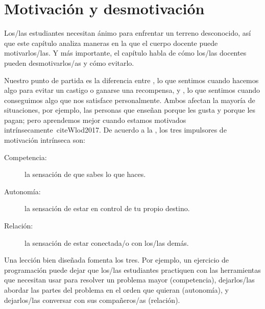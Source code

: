 \chapter{Motivación y desmotivación}\label{s:motivation}

Los/las estudiantes necesitan ánimo para enfrentar un terreno desconocido,
así que este capítulo analiza maneras en la que el cuerpo docente puede motivarlos/las.
Y más importante,
el capítulo habla de cómo los/las docentes pueden desmotivarlos/as
y cómo evitarlo.

Nuestro punto de partida es la diferencia entre
,
lo que sentimos cuando hacemos algo para evitar un castigo o ganarse una recompensa,
y ,
lo que sentimos cuando conseguimos algo que nos satisface personalmente.
Ambos afectan la mayoría de situaciones, por ejemplo,
las personas que enseñan porque les gusta y porque les pagan; pero
aprendemos mejor cuando estamos motivados intrínsecamente~cite{Wlod2017}.
De acuerdo a la 
,
los tres impulsores de motivación intrínseca son:

\begin{description}

\item[Competencia:]
  la sensación de que sabes lo que haces. 

\item[Autonomía:]
  la sensación de estar en control de tu propio destino.

\item[Relación:]
  la sensación de estar conectada/o con los/las demás.

\end{description}

Una lección bien diseñada fomenta los tres.
Por ejemplo,
un ejercicio de programación puede
dejar que los/las estudiantes practiquen con las herramientas que necesitan usar para resolver un problema mayor (competencia),
dejarlos/las abordar las partes del problema en el orden que quieran (autonomía),
y dejarlos/las conversar con sus compañeros/as (relación).

